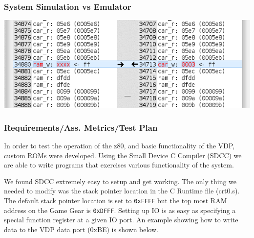 \documentclass[xcolor=table]{beamer}
\begin{document}
\begin{frame}
    \frametitle{System Simulation vs Emulator}
    \includegraphics[width=\textwidth]{../images/diff_x.png}
\end{frame}

\begin{frame}
    \frametitle{Requirements/Ass. Metrics/Test Plan}
    In order to test the operation of the z80, and basic functionality of the VDP,
    custom ROMs were developed. Using the Small Device C Compiler (SDCC)
    \cite{SDCC} we are able to write programs that exercises various functionality
    of the system.

    We found SDCC extremely easy to setup and get working. The only thing we needed
    to modify was the stack pointer location in the C Runtime file (crt0.s). The
    default stack pointer location is set to \texttt{0xFFFF} but the top most RAM
    address on the Game Gear is \texttt{0xDFFF}. Setting up IO is as easy as
    specifying a special function register at a given IO port. An example showing
    how to write data to the VDP data port (0xBE) is shown below.
\end{frame}

%
%
\end{document}
